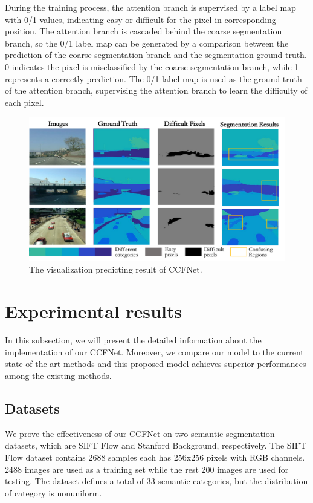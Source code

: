 \documentclass[10.5pt,compsoc]{TsT}
\newcommand{\upcite}[1]{\superscript{\textsuperscript{\cite{#1}}}}
\theoremstyle{mystyle}
\newcommand{\upcite}[1]{\textsuperscript{\cite{#1}}}
\begin{document}
{During the training process, the attention branch is supervised by a label map with 0/1 values, indicating  easy or difficult for the pixel in corresponding position.
The attention branch is cascaded behind the coarse segmentation branch, so the 0/1 label map can be generated by a comparison between the prediction of the coarse segmentation branch and the segmentation ground truth.
0 indicates the pixel is misclassified by the coarse segmentation branch, while 1 represents a correctly prediction.
The 0/1 label map is used as the ground truth of the attention branch, supervising the attention branch to learn the difficulty of each pixel.
\begin{figure}[ht]
\centering
\includegraphics[width=1.9\columnwidth]{fig3.png}
\caption{The visualization predicting result of CCFNet.}
\label{fig3}
\end{figure} 

\section{Experimental results}
\label{s:results}
\noindent
In this subsection, we will present the detailed information about the implementation of our CCFNet. Moreover, we compare our model to the current state-of-the-art methods and this proposed model achieves superior performances among the existing methods.

\subsection{Datasets}
\noindent
We prove the effectiveness of our CCFNet on two semantic segmentation datasets, which are SIFT Flow\upcite{8} and Stanford Background\upcite{9}, respectively. The SIFT Flow dataset contains 2688 samples each has 256x256 pixels with RGB channels. 2488 images are used as a training set while the rest 200 images are used for testing. The dataset defines a total of 33 semantic categories, but the distribution of category is nonuniform.

}
\end{document}
